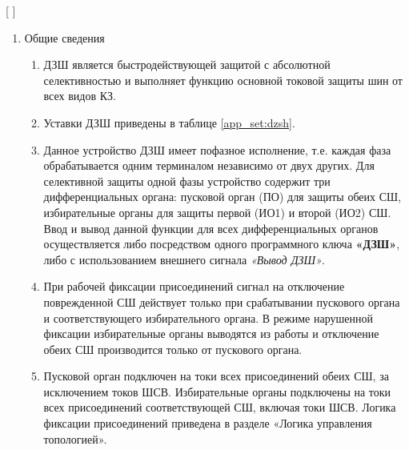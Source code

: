 
[
\def\Num{??}
]


\color{black}

\begin{enumerate}

\item Общие сведения

\begin{enumerate}

\item
ДЗШ является быстродействующей защитой с абсолютной селективностью и выполняет функцию основной токовой защиты шин от всех видов КЗ.

\item 
Уставки ДЗШ приведены в таблице \ref{app_set:dzsh}.

\item
Данное устройство ДЗШ имеет пофазное исполнение, т.е. каждая фаза обрабатывается одним терминалом независимо от двух других. Для селективной защиты одной фазы устройство содержит три дифференциальных органа: пусковой орган (ПО) для защиты обеих СШ, избирательные органы для защиты первой (ИО1) и второй (ИО2) СШ. Ввод и вывод данной функции для всех дифференциальных органов осуществляется либо посредством одного программного ключа \textbf{«ДЗШ»}, либо с использованием внешнего сигнала \textit{«Вывод ДЗШ»}.

\item
При рабочей фиксации присоединений сигнал на отключение поврежденной СШ действует только при срабатывании пускового органа и соответствующего избирательного органа. В режиме нарушенной фиксации избирательные органы выводятся из работы и отключение обеих СШ производится только от пускового органа.

\item
Пусковой орган подключен на токи всех присоединений обеих СШ, за исключением токов ШСВ. Избирательные органы подключены на токи всех присоединений соответствующей СШ, включая токи ШСВ. Логика фиксации присоединений приведена в разделе «Логика управления топологией».


\end{enumerate}
\end{enumerate}
